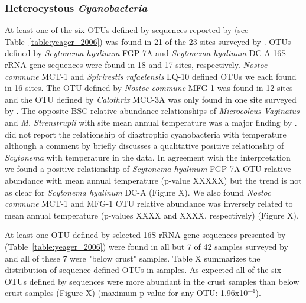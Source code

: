 \subsubsection{Heterocystous \textit{Cyanobacteria}}
At least one of the six OTUs defined by sequences reported by \citet{Yeager} (see Table~\ref{table:yeager_2006}) was found in 21 of the 23 sites surveyed by \citet{Garcia_Pichel_2013}. OTUs defined by \textit{Scytonema hyalinum} FGP-7A and \textit{Scytonema hyalinum} DC-A 16S rRNA gene sequences were found in 18 and 17 sites, respectively. \textit{Nostoc commune} MCT-1 and \textit{Spirirestis rafaelensis} LQ-10 defined OTUs we each found in 16 sites. The OTU defined by \textit{Nostoc commune} MFG-1 was found in 12 sites and the OTU defined by \textit{Calothrix} MCC-3A was only found in one site surveyed by \citet{Garcia_Pichel_2013}. The opposite BSC relative abundance relationships of \textit{Microcoleus Vaginatus} and \textit{M. Strenstrupii} with site mean annual temperature was a major finding by \citet{Garcia_Pichel_2013}. \citet{Garcia_Pichel_2013} did not report the relationship of diaztrophic cyanobacteria with temperature although a comment by \citet{Belnap28062013} briefly discusses a qualitative positive relationship of \textit{Scytonema} with temperature in the \citet{Garcia_Pichel_2013} data. In agreement with the \citet{Belnap28062013} interpretation we found a positive relationship of \textit{Scytonema hyalinum} FGP-7A OTU relative abundance with mean annual temperature (p-value XXXXX) but the trend is not as clear for \textit{Scytonema hyalinum} DC-A (Figure X). We also found \textit{Nostoc commune} MCT-1 and MFG-1 OTU relative abundance was inversely related to mean annual temperature (p-values XXXX and XXXX, respectively) (Figure X). 

At least one OTU defined by selected 16S rRNA gene sequences presented by \citet{Yeager} (Table~\ref{table:yeager_2006}) were found in all but 7 of 42 samples surveyed by \citet{Steven_2013} and all of these 7 were "below crust" samples. Table X summarizes the distribution of \citet{Yeager} sequence defined OTUs in \citet{Steven_2013} samples. As expected all of the six OTUs defined by \citet{Yeager} sequences were more abundant in the crust samples than below crust samples (Figure X) (maximum p-value for any OTU: 1.96x10$^{-4}$).
